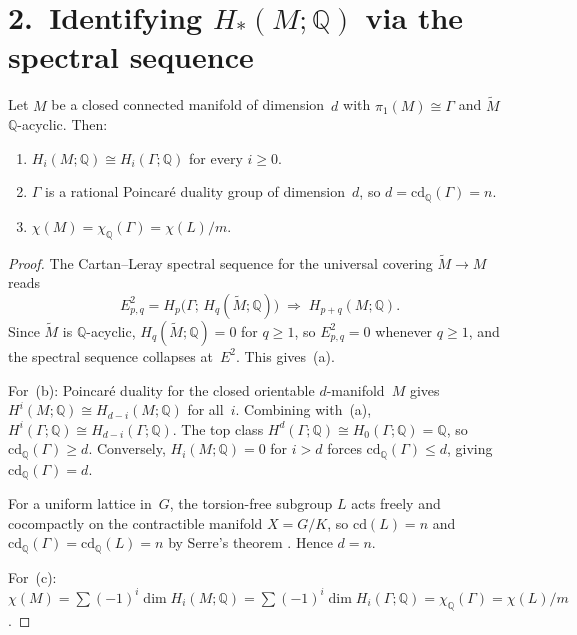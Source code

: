 \section*{2.\ Identifying $H_*(M;\mathbb{Q})$ via the spectral sequence}
\label{sec:p7-ss}

\begin{proposition}
\label{prop:p7-ss-collapse}
Let $M$ be a closed connected manifold of dimension~$d$ with
$\pi_1(M)\cong\Gamma$ and $\widetilde{M}$~$\mathbb{Q}$-acyclic. Then:
\begin{enumerate}
\item[(a)] $H_i(M;\mathbb{Q}) \cong H_i(\Gamma;\mathbb{Q})$ for every $i\ge 0$.
\item[(b)] $\Gamma$ is a rational Poincar\'e duality group of dimension~$d$,
so $d = \mathrm{cd}_\mathbb{Q}(\Gamma) = n$.
\item[(c)] $\chi(M) = \chi_\mathbb{Q}(\Gamma) = \chi(L)/m$.
\end{enumerate}
\end{proposition}

\begin{proof}
The Cartan--Leray spectral sequence for the universal covering
$\widetilde{M}\to M$ reads
\[
  E^2_{p,q} = H_p\bigl(\Gamma;\, H_q(\widetilde{M};\mathbb{Q})\bigr)
  \;\Longrightarrow\;
  H_{p+q}(M;\mathbb{Q}).
\]
Since $\widetilde{M}$ is $\mathbb{Q}$-acyclic,
$H_q(\widetilde{M};\mathbb{Q})=0$ for $q\ge 1$, so $E^2_{p,q}=0$ whenever
$q\ge 1$, and the spectral sequence collapses at~$E^2$. This gives~(a).

For~(b): Poincar\'e duality for the closed orientable $d$-manifold~$M$ gives
$H^i(M;\mathbb{Q})\cong H_{d-i}(M;\mathbb{Q})$ for all~$i$. Combining with~(a),
$H^i(\Gamma;\mathbb{Q})\cong H_{d-i}(\Gamma;\mathbb{Q})$.
The top class $H^d(\Gamma;\mathbb{Q})\cong H_0(\Gamma;\mathbb{Q})=\mathbb{Q}$,
so $\mathrm{cd}_\mathbb{Q}(\Gamma)\ge d$.  Conversely, $H_i(M;\mathbb{Q})=0$
for $i>d$ forces $\mathrm{cd}_\mathbb{Q}(\Gamma)\le d$, giving
$\mathrm{cd}_\mathbb{Q}(\Gamma)=d$.

For a uniform lattice in~$G$, the torsion-free subgroup $L$ acts freely and
cocompactly on the contractible manifold $X=G/K$, so
$\mathrm{cd}(L)=n$ and $\mathrm{cd}_\mathbb{Q}(\Gamma)
=\mathrm{cd}_\mathbb{Q}(L)=n$ by Serre's theorem
\cite[Ch.\,VIII, \S\,2]{Brown}. Hence $d=n$.

For~(c): $\chi(M)=\sum(-1)^i\dim H_i(M;\mathbb{Q})
=\sum(-1)^i\dim H_i(\Gamma;\mathbb{Q})
=\chi_\mathbb{Q}(\Gamma)=\chi(L)/m$.
\end{proof}

